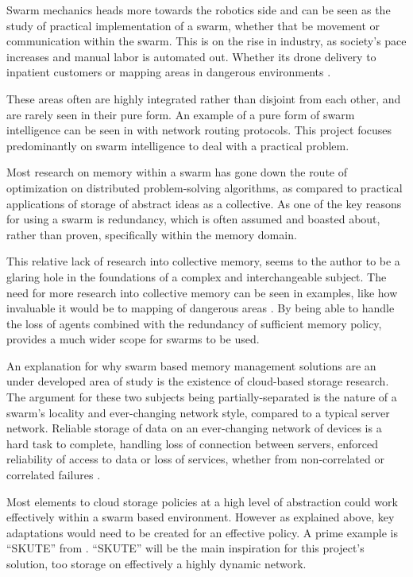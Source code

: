 \documentclass{UoYCSproject}
\begin{document}
Swarm mechanics heads more towards the robotics side and can be seen as the study of practical implementation of a swarm, whether that be movement or communication within the swarm.
This is on the rise in industry, as society's pace increases and manual labor is automated out. Whether its drone delivery to inpatient customers or mapping areas in dangerous environments \cite{Swarm robotics reviewed}.

These areas often are highly integrated rather than disjoint from each other, and are rarely seen in their pure form.
An example of a pure form of swarm intelligence can be seen in \cite{Swarm intellegiegence} with network routing protocols.
This project focuses predominantly on swarm intelligence to deal with a practical problem.

Most research on memory within a swarm has gone down the route of optimization on distributed problem-solving algorithms, as compared to practical applications of storage of abstract ideas as a collective.
As one of the key reasons for using a swarm is redundancy, which is often assumed and boasted about, rather than proven, specifically within the memory domain.

This relative lack of research into collective memory, seems to the author to be a glaring hole in the foundations of a complex and interchangeable subject.
The need for more research into collective memory can be seen in examples, like how invaluable it would be to mapping of dangerous areas \cite{Cognitive maps mine detection}.
By being able to handle the loss of agents combined with the redundancy of sufficient memory policy, provides a much wider scope for swarms to be used.

An explanation for why swarm based memory management solutions are an under developed area of study is the existence of cloud-based storage research.
The argument for these two subjects being partially-separated is the nature of a swarm's locality and ever-changing network style, compared to a typical server network.
Reliable storage of data on an ever-changing network of devices is a hard task to complete, handling loss of connection between servers, enforced reliability of access to data or loss of services, whether from non-correlated or correlated failures \cite{Avalability storage}.

Most elements to cloud storage policies at a high level of abstraction could work effectively within a swarm based environment.
However as explained above, key adaptations would need to be created for an effective policy.
A prime example is “SKUTE” from \cite{Distributed Storage}.
“SKUTE” will be the main inspiration for this project's solution, too storage on effectively a highly dynamic network.
\end{document}
